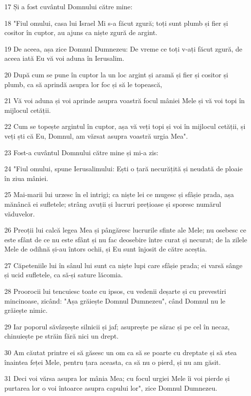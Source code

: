 \par 17 Și a fost cuvântul Domnului către mine:
\par 18 "Fiul omului, casa lui Israel Mi s-a făcut zgură; toți sunt plumb și fier și cositor în cuptor, au ajuns ca niște zgură de argint.
\par 19 De aceea, așa zice Domnul Dumnezeu: De vreme ce toți v-ați făcut zgură, de aceea iată Eu vă voi aduna în Ierusalim.
\par 20 După cum se pune în cuptor la un loc argint și aramă și fier și cositor și plumb, ca să aprindă asupra lor foc și să le topească,
\par 21 Vă voi aduna și voi aprinde asupra voastră focul mâniei Mele și vă voi topi în mijlocul cetății.
\par 22 Cum se topește argintul în cuptor, așa vă veți topi și voi în mijlocul cetății, și veți ști că Eu, Domnul, am vărsat asupra voastră urgia Mea".
\par 23 Fost-a cuvântul Domnului către mine și mi-a zis:
\par 24 "Fiul omului, spune Ierusalimului: Ești o țară necurățită și neudată de ploaie în ziua mâniei.
\par 25 Mai-marii lui urzesc în el intrigi; ca niște lei ce mugesc și sfâșie prada, așa mănâncă ei sufletele; strâng avuții și lucruri prețioase și sporesc numărul văduvelor.
\par 26 Preoții lui calcă legea Mea și pângăresc lucrurile sfinte ale Mele; nu osebesc ce este sfânt de ce nu este sfânt și nu fac deosebire între curat și necurat; de la zilele Mele de odihnă și-au întors ochii, și Eu sunt înjosit de către aceștia.
\par 27 Căpeteniile lui în sânul lui sunt ca niște lupi care sfâșie prada; ei varsă sânge și ucid sufletele, ca să-și sature lăcomia.
\par 28 Proorocii lui tencuiesc toate cu ipsos, cu vedenii deșarte și cu prevestiri mincinoase, zicând: "Așa grăiește Domnul Dumnezeu", când Domnul nu le grăiește nimic.
\par 29 Iar poporul săvârșește silnicii și jaf; asuprește pe sărac și pe cel în necaz, chinuiește pe străin fără nici un drept.
\par 30 Am căutat printre ei să găsesc un om ca să se poarte cu dreptate și să stea înaintea feței Mele, pentru țara aceasta, ca să nu o pierd, și nu am găsit.
\par 31 Deci voi vărsa asupra lor mânia Mea; cu focul urgiei Mele îi voi pierde și purtarea lor o voi întoarce asupra capului lor", zice Domnul Dumnezeu.

